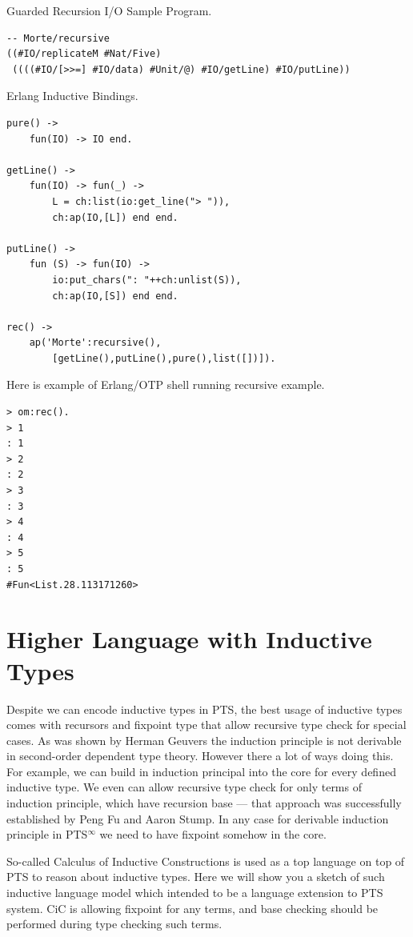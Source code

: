 \documentclass{aip-cp}
\begin{document}
Guarded Recursion I/O Sample Program.

\begin{lstlisting}[mathescape=true]
-- Morte/recursive
((#IO/replicateM #Nat/Five)
 ((((#IO/[>>=] #IO/data) #Unit/@) #IO/getLine) #IO/putLine))
\end{lstlisting}

Erlang Inductive Bindings.

\begin{lstlisting}[mathescape=true]
pure() ->
    fun(IO) -> IO end.

getLine() ->
    fun(IO) -> fun(_) ->
        L = ch:list(io:get_line("> ")),
        ch:ap(IO,[L]) end end.

putLine() ->
    fun (S) -> fun(IO) ->
        io:put_chars(": "++ch:unlist(S)),
        ch:ap(IO,[S]) end end.

rec() ->
    ap('Morte':recursive(),
        [getLine(),putLine(),pure(),list([])]).
\end{lstlisting}


Here is example of Erlang/OTP shell running recursive example.

\begin{lstlisting}[mathescape=true]
> om:rec().
> 1
: 1
> 2
: 2
> 3
: 3
> 4
: 4
> 5
: 5
#Fun<List.28.113171260>
\end{lstlisting}

\section{Higher Language with Inductive Types}Despite we can encode inductive types in PTS, the best usage of inductive types comes with recursors and fixpoint type that allow recursive type check for special cases.
As was shown by Herman Geuvers\cite{Geuvers01} the induction principle is not derivable in second-order dependent type theory.
However there a lot of ways doing this. For example, we can build in induction principal into the core for every defined inductive type.
We even can allow recursive type check for only terms of induction principle, which have recursion base --- that approach was successfully established by Peng Fu and Aaron Stump\cite{Stump17}.
In any case for derivable induction principle in PTS$^\infty$ we need to have fixpoint somehow in the core.

So-called Calculus of Inductive Constructions\cite{Mohring15} is used as a top language on top of PTS to reason about inductive types.
Here we will show you a sketch of such inductive language model which intended to be a language extension to PTS system.
CiC is allowing fixpoint for any terms, and base checking should be performed during type checking such terms.
\end{document}
